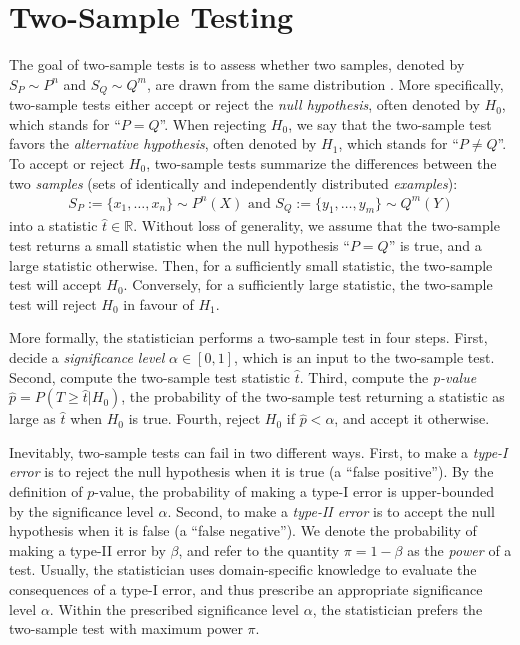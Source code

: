 \documentclass[a4paper]{article}
\begin{document}
  \section{Two-Sample Testing}\label{sec:two}
  The goal of two-sample tests is to assess whether two samples, denoted by
  $S_P \sim P^n$ and $S_Q \sim Q^m$, are drawn from the same distribution
  \citep{lehmann2006testing}.  More specifically, two-sample tests either
  accept or reject the \emph{null hypothesis}, often denoted by $H_0$, which
  stands for ``$P= Q$''. When rejecting $H_0$, we say that the two-sample test
  favors the \emph{alternative hypothesis}, often denoted by $H_1$, which
  stands for ``$P \neq Q$''. To accept or reject $H_0$, two-sample tests
  summarize the differences between the two \emph{samples} (sets of identically
  and independently distributed \emph{examples}):
  \begin{align}
    S_P := \{ x_1, \ldots, x_n \} \sim P^n(X) \text{ and } S_Q := \{ y_1,
    \ldots, y_m \} \sim Q^m(Y)\label{eq:samples}
  \end{align}
  into a statistic $\hat{t} \in \mathbb{R}$.  Without loss of generality, we
  assume that the two-sample test returns a small statistic when
  the {null hypothesis} ``$P=Q$'' is true, and a large statistic otherwise.
  Then, for a sufficiently small statistic, the two-sample test will accept
  $H_0$.  Conversely, for a sufficiently large statistic, the two-sample test
  will reject $H_0$ in favour of $H_1$.

  More formally, the statistician performs a two-sample test in four steps.
  First, decide a \emph{significance level} $\alpha \in [0,1]$, which is an
  input to the two-sample test. Second, compute the two-sample test statistic
  $\hat{t}$.  Third, compute the \emph{p-value} $\hat{p} = P(T \geq \hat{t} |
  H_0)$, the probability of the two-sample test returning a statistic as large
  as $\hat{t}$ when $H_0$ is true. Fourth, reject $H_0$ if $\hat{p} < \alpha$,
  and accept it otherwise. 

  Inevitably, two-sample tests can fail in two different ways.  First, to make
  a \emph{type-I error} is to reject the null hypothesis when it is true (a
  ``false positive''). By the definition of $p$-value, the probability of making a type-I error is
  upper-bounded by the significance level $\alpha$.  Second, to make a
  \emph{type-II error} is to accept the null hypothesis when it is false (a
  ``false negative'').  We denote the probability of making a type-II error by
  $\beta$, and refer to the quantity $\pi = 1-\beta$ as the \emph{power} of
  a test. Usually, the statistician uses domain-specific knowledge to evaluate
  the consequences of a type-I error, and thus prescribe an appropriate
  significance level $\alpha$.  Within the prescribed significance level
  $\alpha$, the statistician prefers the two-sample test with maximum power
  $\pi$.
\end{document}
